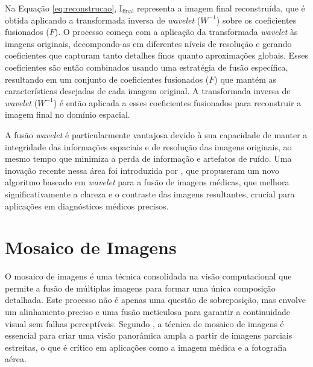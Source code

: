 Na Equação \ref{eq:reconstrucao}, \( \text{I}_{\text{final}} \) representa a imagem final reconstruída, que é obtida aplicando a transformada inversa de \textit{wavelet} (\( W^{-1} \)) sobre os coeficientes fusionados (\( F \)). O processo começa com a aplicação da transformada \textit{wavelet} às imagens originais, decompondo-as em diferentes níveis de resolução e gerando coeficientes que capturam tanto detalhes finos quanto aproximações globais. Esses coeficientes são então combinados usando uma estratégia de fusão específica, resultando em um conjunto de coeficientes fusionados (\( F \)) que mantém as características desejadas de cada imagem original. A transformada inversa de \textit{wavelet} (\( W^{-1} \)) é então aplicada a esses coeficientes fusionados para reconstruir a imagem final no domínio espacial. 

A fusão \textit{wavelet} é particularmente vantajosa devido à sua capacidade de manter a integridade das informações espaciais e de resolução das imagens originais, ao mesmo tempo que minimiza a perda de informação e artefatos de ruído. Uma inovação recente nessa área foi introduzida por , que propuseram um novo algoritmo baseado em \textit{wavelet} para a fusão de imagens médicas, que melhora significativamente a clareza e o contraste das imagens resultantes, crucial para aplicações em diagnósticos médicos precisos.

\section{Mosaico de Imagens}\label{sec:mosaico}

O mosaico de imagens é uma técnica consolidada na visão computacional que permite a fusão de múltiplas imagens para formar uma única composição detalhada. Este processo não é apenas uma questão de sobreposição, mas envolve um alinhamento preciso e uma fusão meticulosa para garantir a continuidade visual sem falhas perceptíveis. Segundo , a técnica de mosaico de imagens é essencial para criar uma visão panorâmica ampla a partir de imagens parciais estreitas, o que é crítico em aplicações como a imagem médica e a fotografia aérea.



